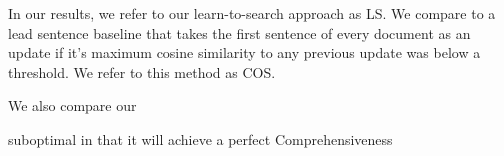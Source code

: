 In our results, we refer to our learn-to-search approach as LS.
We compare to a lead sentence baseline that takes the first sentence
of every document as an update if it's maximum cosine similarity to any 
previous update was below a threshold. We refer to this method as COS.

We also compare our 








suboptimal in that it will achieve a perfect
Comprehensiveness 
























